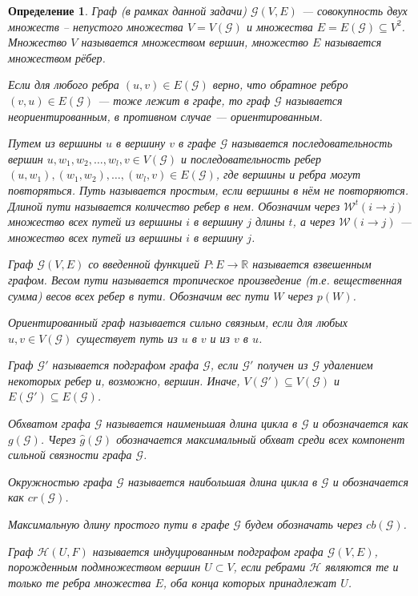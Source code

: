 \documentclass[12pt]{article}
\newtheorem{definition}[theorem]{Определение}
\begin{document}
\begin{definition}
Граф (в рамках данной задачи) ${\mathcal{G}(V,E)}$ --- совокупность двух множеств – непустого множества $V = V(\mathcal{G})$ и множества $E = E(\mathcal{G}) \subseteq V^2$. Множество ${V}$ называется множеством вершин, множество ${E}$ называется множеством рёбер.

Если для любого ребра $(u, v) \in E(\mathcal{G})$ верно, что обратное ребро $(v, u) \in E(\mathcal{G})$ --- тоже лежит в графе, то граф $\mathcal{G}$ называется неориентированным, в противном случае --- ориентированным.

Путем из вершины $u$ в вершину $v$ в графе $\mathcal{G}$ называется последовательность вершин $u, w_1, w_2, \dots, w_l, v \in V(\mathcal{G})$ и последовательность ребер $(u, w_1), (w_1, w_2), \dots, (w_l, v) \in E(\mathcal{G})$, где вершины и ребра могут повторяться. Путь называется простым, если вершины в нём не повторяются. Длиной пути называется количество ребер в нем. Обозначим через $\mathcal{W}^t(i \rightarrow j)$ множество всех путей из вершины $i$ в вершину $j$ длины $t$, а через $\mathcal{W}(i \rightarrow j)$ --- множество всех путей из вершины $i$ в вершину $j$.

Граф $\mathcal{G}(V, E)$ со введенной функцией $P : E \rightarrow \mathbb{R}$ называется взвешенным графом. Весом пути называется тропическое произведение (т.е. вещественная сумма) весов всех ребер в пути. Обозначим вес пути $W$ через $p(W)$. 

Ориентированный граф называется сильно связным, если для любых $u, v \in V(\mathcal{G})$ существует путь из $u$ в $v$ и из $v$ в $u$.
        
Граф $\mathcal{G}'$ называется подграфом графа $\mathcal{G}$, если $\mathcal{G}'$ получен из $\mathcal{G}$ удалением некоторых ребер и, возможно, вершин. Иначе, $V(\mathcal{G}') \subseteq V(\mathcal{G})$ и $E(\mathcal{G}') \subseteq E(\mathcal{G})$.

Обхватом графа $\mathcal{G}$ называется наименьшая длина цикла в $\mathcal{G}$ и обозначается как $g(\mathcal{G})$. Через $\hat{g}(\mathcal{G})$ обозначается максимальный обхват среди всех компонент сильной связности графа $\mathcal{G}$.

Окружностью графа $\mathcal{G}$ называется наибольшая длина цикла в $\mathcal{G}$ и обозначается как $cr(\mathcal{G})$.

Максимальную длину простого пути в графе $\mathcal{G}$ будем обозначать через $cb(\mathcal{G})$.

Граф $\mathcal{H}(U, F)$ называется индуцированным подграфом графа $\mathcal{G}(V, E)$, порожденным подмножеством вершин $U \subset V$, если ребрами $\mathcal{H}$ являются те и только те ребра множества $E$, оба конца которых принадлежат $U$.
\end{definition}
\end{document}
